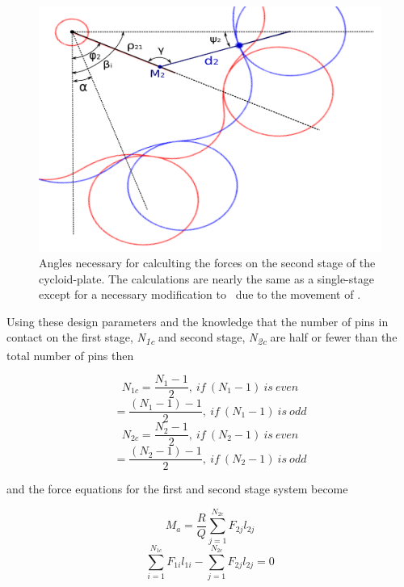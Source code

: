 \begin{figure}[t]
	\centering
	\includegraphics[width=0.8\linewidth]{fig/two_stage_loads_angles_2}
   \caption{Angles necessary for calculting the forces on the second stage of the cycloid-plate. The calculations are nearly the same as a single-stage except for a necessary modification to \textbeta\ due to the movement of \textalpha.}
   \label{fig:two_stage_force_beta}
\end{figure}

Using these design parameters and the knowledge that the number of pins in contact on the first stage, \textit{N\textsubscript{1c}} and second stage, \textit{N\textsubscript{2c}} are half or fewer than the total number of pins then

\begin{equation}
N_{1c} = \frac{N_{1} - 1}{2},\ if\ (N_1 -1)\ is\ even 
\end{equation}
\begin{equation}
= \frac{(N_{1}-1) - 1}{2},\ if\ (N_{1} - 1)\ is\ odd 
\end{equation}
\begin{equation}
N_{2c} = \frac{N_{2}-1}{2},\ if\ (N_{2}-1)\ is\ even 
\end{equation}
\begin{equation}
= \frac{(N_{2}-1) - 1}{2},\ if\ (N_{2}-1)\ is\ odd 
\end{equation}

and the force equations for the first and second stage system become

\begin{equation} \label{eq:dual_power}
M_a = \frac{R}{Q} \sum_{j=1}^{N_{2c}} F_{2j} l_{2j}
\end{equation}
\begin{equation} \label{eq:dual_torqe}
\sum_{i=1}^{N_{1c}}F_{1i} l_{1i} - \sum_{j=1}^{N_{2c}}F_{2j} l_{2j} = 0
\end{equation}

